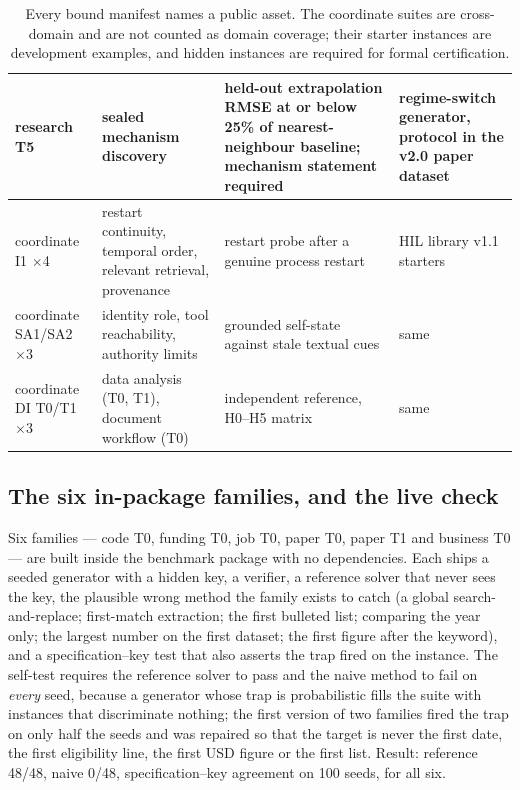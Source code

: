\begin{table}[H]
\begin{tabularx}{\textwidth}{@{}p{2.2cm}p{3.4cm}YY@{}}
research T5 & sealed mechanism discovery & held-out extrapolation RMSE at or below 25\% of nearest-neighbour baseline; mechanism statement required & regime-switch generator, protocol in the v2.0 paper dataset \\
\midrule
coordinate I1 $\times$4 & restart continuity, temporal order, relevant retrieval, provenance & restart probe after a genuine process restart & HIL library v1.1 starters \\
coordinate SA1/SA2 $\times$3 & identity role, tool reachability, authority limits & grounded self-state against stale textual cues & same \\
coordinate DI T0/T1 $\times$3 & data analysis (T0, T1), document workflow (T0) & independent reference, H0--H5 matrix & same \\
\bottomrule
\end{tabularx}
\caption{Every bound manifest names a public asset. The coordinate suites are cross-domain and are not counted as domain coverage; their starter instances are development examples, and hidden instances are required for formal certification.}
\label{tab:bound}
\end{table}

\subsection{The six in-package families, and the live check}

Six families --- code T0, funding T0, job T0, paper T0, paper T1 and business T0 --- are built inside the benchmark package with no dependencies. Each ships a seeded generator with a hidden key, a verifier, a reference solver that never sees the key, the plausible wrong method the family exists to catch (a global search-and-replace; first-match extraction; the first bulleted list; comparing the year only; the largest number on the first dataset; the first figure after the keyword), and a specification--key test that also asserts the trap fired on the instance. The self-test requires the reference solver to pass and the naive method to fail on \emph{every} seed, because a generator whose trap is probabilistic fills the suite with instances that discriminate nothing; the first version of two families fired the trap on only half the seeds and was repaired so that the target is never the first date, the first eligibility line, the first USD figure or the first list. Result: reference 48/48, naive 0/48, specification--key agreement on 100 seeds, for all six.

